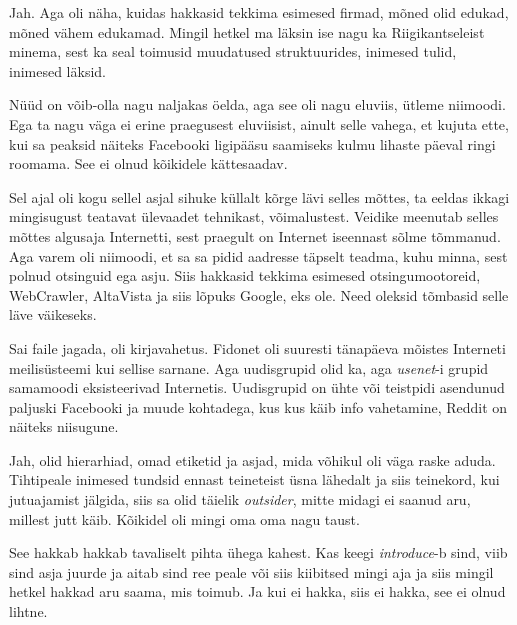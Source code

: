          

Jah. Aga oli näha, kuidas hakkasid tekkima esimesed firmad, mõned olid edukad, 
mõned vähem edukamad. Mingil hetkel ma läksin ise nagu ka Riigikantseleist 
minema, sest ka seal toimusid muudatused struktuurides, inimesed tulid, 
inimesed läksid.


Nüüd on võib-olla nagu naljakas öelda, aga see oli nagu eluviis, ütleme 
niimoodi. Ega ta nagu väga ei erine praegusest eluviisist, ainult selle vahega, 
et kujuta ette, kui sa peaksid näiteks Facebooki ligipääsu saamiseks kulmu 
lihaste päeval ringi roomama. See ei olnud kõikidele kättesaadav. 
                 
Sel ajal oli kogu sellel asjal sihuke küllalt kõrge lävi selles mõttes, ta 
eeldas ikkagi mingisugust teatavat ülevaadet tehnikast, võimalustest. Veidike 
meenutab selles mõttes algusaja Internetti, sest praegult on Internet iseennast 
sõlme tõmmanud. Aga varem oli niimoodi, et sa sa pidid aadresse täpselt teadma, 
kuhu minna, sest polnud otsinguid ega asju. Siis hakkasid tekkima esimesed 
otsingumootoreid, WebCrawler, AltaVista ja siis lõpuks Google, eks ole. Need 
oleksid tõmbasid selle läve  väikeseks. 

                 
Sai faile jagada, oli kirjavahetus. Fidonet oli suuresti tänapäeva mõistes 
Interneti meilisüsteemi kui sellise sarnane. Aga uudisgrupid olid ka, aga 
\emph{usenet}-i grupid samamoodi eksisteerivad Internetis. Uudisgrupid on ühte 
või teistpidi asendunud paljuski Facebooki ja muude kohtadega, kus kus käib 
info vahetamine, Reddit on näiteks niisugune.


Jah, olid hierarhiad, omad etiketid ja asjad, mida võhikul oli väga raske 
aduda. Tihtipeale inimesed tundsid ennast teineteist üsna lähedalt ja siis 
teinekord, kui jutuajamist jälgida, siis sa olid täielik \emph{outsider}, mitte 
midagi ei saanud aru, millest jutt käib. Kõikidel oli mingi oma oma nagu taust.


See hakkab hakkab tavaliselt pihta ühega kahest. Kas keegi \emph{introduce}-b 
sind, viib sind asja juurde ja aitab sind ree peale või siis kiibitsed mingi 
aja ja siis mingil hetkel hakkad aru saama, mis toimub. Ja kui ei hakka, siis 
ei hakka, see ei olnud lihtne.

